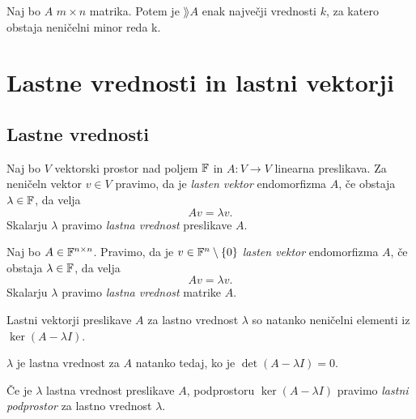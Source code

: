 \documentclass[12pt, a4paper]{article}
\begin{document}
\begin{izrek}
Naj bo $A$ $m\times n$ matrika. Potem je $\rang A$ enak največji vrednosti $k$, za katero obstaja neničelni minor reda k.
\end{izrek}

\obvs

\newpage

\section{Lastne vrednosti in lastni vektorji}

\subsection{Lastne vrednosti}

\begin{okvir}
\begin{definicija}
Naj bo $V$ vektorski prostor nad poljem $\mathbb{F}$ in $A\colon V\to V$ linearna preslikava. Za neničeln vektor $v\in V$ pravimo, da je \emph{lasten vektor} endomorfizma $A$, če obstaja $\lambda\in\mathbb{F}$, da velja
\[
Av=\lambda v.
\]
Skalarju $\lambda$ pravimo \emph{lastna vrednost} preslikave $A$.
\end{definicija}
\begin{definicija}
Naj bo $A\in\mathbb{F}^{n\times n}$. Pravimo, da je $v\in\mathbb{F}^n\setminus\left\{0\right\}$ \emph{lasten vektor} endomorfizma $A$, če obstaja $\lambda\in\mathbb{F}$, da velja
\[
Av=\lambda v.
\]
Skalarju $\lambda$ pravimo \emph{lastna vrednost} matrike $A$.
\end{definicija}
\end{okvir}

\begin{trditev}
Lastni vektorji preslikave $A$ za lastno vrednost $\lambda$ so natanko neničelni elementi iz $\ker(A-\lambda I)$.
\end{trditev}

\obvs

\begin{posledica}
$\lambda$ je lastna vrednost za $A$ natanko tedaj, ko je $\det(A-\lambda I)=0$.
\end{posledica}

\begin{definicija}
Če je $\lambda$ lastna vrednost preslikave $A$, podprostoru $\ker(A-\lambda I)$ pravimo \emph{lastni podprostor} za lastno vrednost $\lambda$.
\end{definicija}
\end{document}
